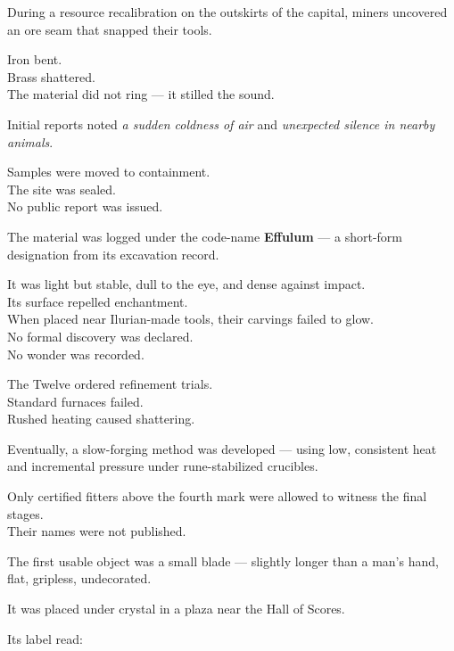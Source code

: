 \documentclass[9pt]{article}
\begin{document}
\vspace{1em}

During a resource recalibration on the outskirts of the capital, miners uncovered an ore seam that snapped their tools.

Iron bent.\\
Brass shattered.\\
The material did not ring — it stilled the sound.

Initial reports noted \textit{a sudden coldness of air} and \textit{unexpected silence in nearby animals}.

Samples were moved to containment.\\
The site was sealed.\\
No public report was issued.

\vspace{1em}

The material was logged under the code-name \textbf{Effulum} — a short-form designation from its excavation record.

It was light but stable, dull to the eye, and dense against impact.\\
Its surface repelled enchantment.\\
When placed near Ilurian-made tools, their carvings failed to glow.\\

No formal discovery was declared.\\
No wonder was recorded.

\vspace{1em}

The Twelve ordered refinement trials.\\
Standard furnaces failed.\\
Rushed heating caused shattering.

Eventually, a slow-forging method was developed — using low, consistent heat and incremental pressure under rune-stabilized crucibles.

Only certified fitters above the fourth mark were allowed to witness the final stages.\\
Their names were not published.

\vspace{1em}

The first usable object was a small blade — slightly longer than a man’s hand, flat, gripless, undecorated.

It was placed under crystal in a plaza near the Hall of Scores.

Its label read:
\end{document}
